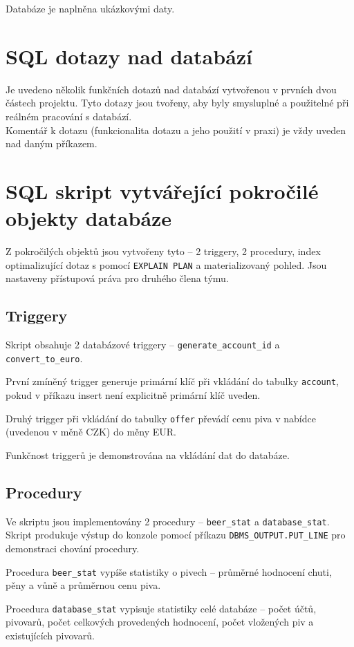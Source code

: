 \documentclass[a4paper, 11pt]{article}
\begin{document}
Databáze je naplněna ukázkovými daty.

\section{SQL dotazy nad databází}
Je uvedeno několik funkčních dotazů nad databází vytvořenou v prvních dvou částech projektu. Tyto dotazy jsou tvořeny, aby byly smysluplné a použitelné při reálném pracování s databází.\\ Komentář k dotazu (funkcionalita dotazu a jeho použití v praxi) je vždy uveden nad daným příkazem.

\section{SQL skript vytvářející pokročilé objekty databáze}
Z pokročilých objektů jsou vytvořeny tyto – 2 triggery, 2 procedury, index optimalizující dotaz s pomocí \texttt{EXPLAIN PLAN} a materializovaný pohled. Jsou nastaveny přístupová práva pro druhého člena týmu.

\subsection{Triggery}
Skript obsahuje 2 databázové triggery – \texttt{generate\_account\_id} a \texttt{convert\_to\_euro}.


První zmíněný trigger generuje primární klíč při vkládání do tabulky \texttt{account}, pokud v příkazu insert není explicitně primární klíč uveden.


Druhý trigger při vkládání do tabulky \texttt{offer} převádí cenu piva v nabídce (uvedenou v měně CZK) do měny EUR. 


Funkčnost triggerů je demonstrována na vkládání dat do databáze. 

\subsection{Procedury}
Ve skriptu jsou implementovány 2 procedury – \texttt{beer\_stat} a \texttt{database\_stat}. 
Skript produkuje výstup do konzole pomocí příkazu \texttt{DBMS\_OUTPUT.PUT\_LINE} pro demonstraci chování procedury. 


Procedura \texttt{beer\_stat} vypíše statistiky o pivech – průměrné hodnocení chuti, pěny a vůně a průměrnou cenu piva. 


Procedura \texttt{database\_stat} vypisuje statistiky celé databáze – počet účtů, pivovarů, počet celkových provedených hodnocení, počet vložených piv a existujících pivovarů. 
\end{document}

